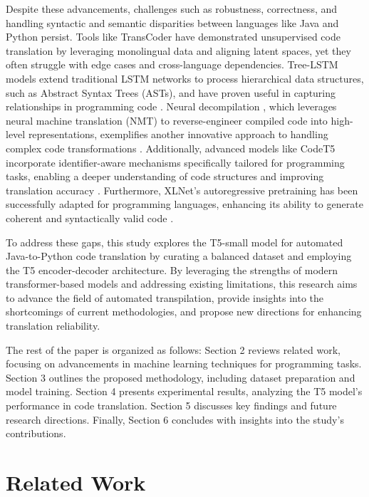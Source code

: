 \documentclass{dhbenelux}
\begin{document}
Despite these advancements, challenges such as robustness, correctness, and handling syntactic and semantic disparities between languages like Java and Python persist. Tools like TransCoder \cite{lachaux2020} have demonstrated unsupervised code translation by leveraging monolingual data and aligning latent spaces, yet they often struggle with edge cases and cross-language dependencies. Tree-LSTM models extend traditional LSTM networks to process hierarchical data structures, such as Abstract Syntax Trees (ASTs), and have proven useful in capturing relationships in programming code \cite{tai2015}. Neural decompilation \cite{katz2019}, which leverages neural machine translation (NMT) \cite{nmt2019} to reverse-engineer compiled code into high-level representations, exemplifies another innovative approach to handling complex code transformations \cite{katz2019}. Additionally, advanced models like CodeT5  incorporate identifier-aware mechanisms specifically tailored for programming tasks, enabling a deeper understanding of code structures and improving translation accuracy \cite{codet52021}. Furthermore, XLNet's autoregressive pretraining has been successfully adapted for programming languages, enhancing its ability to generate coherent and syntactically valid code \cite{xlnet2019}.

To address these gaps, this study explores the T5-small model for automated Java-to-Python code translation by curating a balanced dataset and employing the T5 encoder-decoder architecture. By leveraging the strengths of modern transformer-based models and addressing existing limitations, this research aims to advance the field of automated transpilation, provide insights into the shortcomings of current methodologies, and propose new directions for enhancing translation reliability.

The rest of the paper is organized as follows: Section 2 reviews related work, focusing on advancements in machine learning techniques for programming tasks. Section 3 outlines the proposed methodology, including dataset preparation and model training. Section 4 presents experimental results, analyzing the T5 model's performance in code translation. Section 5 discusses key findings and future research directions. Finally, Section 6 concludes with insights into the study's contributions.


\section{Related Work}
\end{document}
